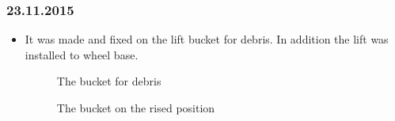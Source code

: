 \subsubsection{23.11.2015}
\begin{itemize}
\item It was made and fixed on the lift bucket for debris. In addition the lift was installed to wheel base. 
\begin{figure}[H]
	\begin{minipage}[h]{1\linewidth}
		\caption{The bucket for debris}
	\end{minipage}
\end{figure} 
\begin{figure}[H]
	\begin{minipage}[h]{1\linewidth}
		\caption{The bucket on the rised position}
	\end{minipage}
\end{figure} 
\end{itemize}
